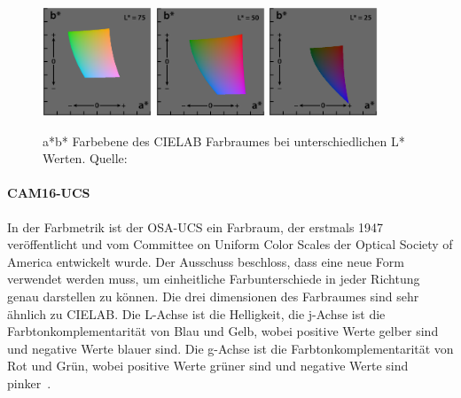 \documentclass[12pt, a4paper, ngerman]{article}
\begin{document}
\begin{figure}
  \centering
  \includegraphics[width=0.29\textwidth]{Grafiken/CIELAB1.png}
  \includegraphics[width=0.29\textwidth]{Grafiken/CIELAB2.png}
  \includegraphics[width=0.29\textwidth]{Grafiken/CIELAB3.png}
  \caption{a*b* Farbebene des CIELAB Farbraumes bei unterschiedlichen L* Werten. Quelle:~\cite{CIELAB_color_space_2023}}
  \label{fig:CIELAB}
\end{figure}

\paragraph{CAM16-UCS}
In der Farbmetrik ist der \ac{OSA-UCS} ein Farbraum, 
der erstmals 1947 veröffentlicht und vom Committee on Uniform Color Scales der Optical Society of America entwickelt wurde.
Der Ausschuss beschloss, dass eine neue Form verwendet werden muss, 
um einheitliche Farbunterschiede in jeder Richtung genau darstellen zu können.
Die drei dimensionen des Farbraumes sind sehr ähnlich zu CIELAB.
Die L-Achse ist die Helligkeit, die j-Achse ist die Farbtonkomplementarität von Blau und Gelb, 
wobei positive Werte gelber sind und negative Werte blauer sind.
Die g-Achse ist die Farbtonkomplementarität von Rot und Grün, 
wobei positive Werte grüner sind und negative Werte sind pinker~\cite{OSA-UCS_2023}.
\end{document}
